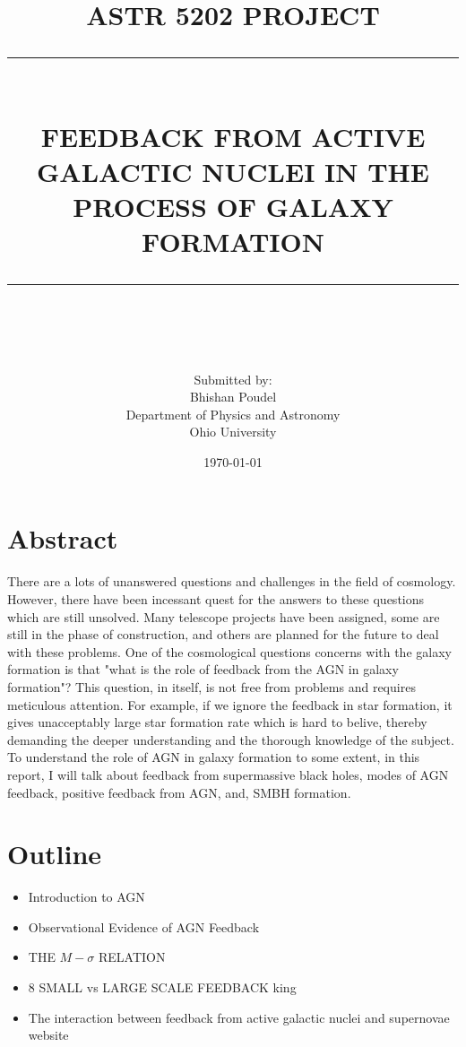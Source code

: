 \documentclass[12pt]{article}
\newcommand{\HRule}[1]{\rule{\linewidth}{#1}}
\begin{document}
\title{ \normalsize \textsc{ASTR 5202 PROJECT}
		\\ [2.0cm]
		\HRule{0.5pt} \\
		\LARGE \textbf{\uppercase{Feedback From Active Galactic Nuclei In The Process Of Galaxy formation}}
		\HRule{2pt} \\ [0.5cm]
		\normalsize  \vspace*{5\baselineskip}}

\date{\today}

\author{
		Submitted by:\\
		Bhishan Poudel\\
		Department of Physics and Astronomy\\ 
        Ohio University}
\newpage
\maketitle
\clearpage

\section*{Abstract}

There are a lots of unanswered questions and challenges in the field of cosmology. However, there have been incessant quest for the answers to these questions which are still unsolved. Many telescope projects have been assigned, some are still in the phase of construction, and others are planned for the future to deal with these problems. One of the cosmological questions concerns with the galaxy formation is that "what is the role of feedback from the AGN in galaxy formation"? This question, in itself, is not free from problems and requires meticulous attention. For example, if we ignore the feedback in star formation, it gives unacceptably large star formation rate which is hard to belive, thereby demanding the deeper understanding and the thorough knowledge of the subject. To understand the role of AGN in galaxy formation to some extent, in this report, I will talk about feedback from supermassive black holes, modes of AGN feedback, positive feedback from AGN, and, SMBH formation.
\clearpage

{\tiny }\section*{Outline}
\begin{itemize}
  \item Introduction to AGN
  \item Observational Evidence of AGN Feedback
  \item THE $ M - \sigma$ RELATION
  \item 8 SMALL vs LARGE SCALE FEEDBACK king
  \item The interaction between feedback from active galactic nuclei and supernovae website
 \end{itemize}
\clearpage
\end{document}
